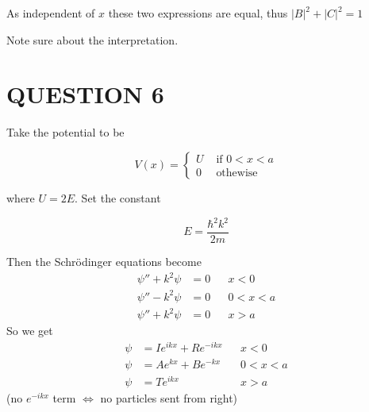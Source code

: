 \documentclass[a4paper]{article}
\begin{document}
As independent of $ x $ these two expressions are equal, thus $ | B |^{2} + | C |^{2} = 1 $

Note sure about the interpretation.




\section{QUESTION 6}

Take the potential to be 

\begin{center}
\end{center}

\[ V(x) = \begin{cases} U  & \text{ if } 0 < x < a \\ 0  & \text{ othewise } \end{cases} \]

where $ U = 2E $. Set the constant

\[
E = \frac{\hbar^2 k^2}{2m}
\]

Then the Schr\"odinger equations become
\begin{align*}
\psi'' + k^2 \psi &= 0 && x < 0\\
\psi'' - k^2 \psi &= 0 && 0 < x < a\\
\psi'' + k^2 \psi &= 0 && x > a
\end{align*}
So we get
\begin{align*}
\psi &= I e^{ikx} + Re^{-ikx}&& x < 0\\
\psi &= Ae^{k x} + Be^{-k x}&& 0 < x < a\\
\psi &= Te^{ikx} && x > a
\end{align*}
(no $ e^{-ikx} $ term $ \iff $ no particles sent from right)
\end{document}
